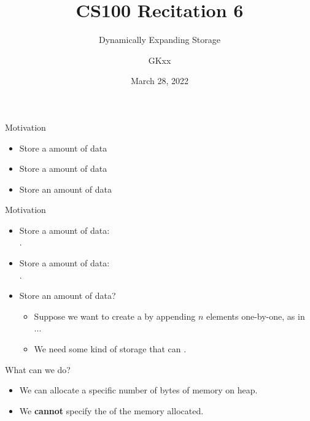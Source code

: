 \documentclass{beamer}
\title{CS100 Recitation 6}
\subtitle{Dynamically Expanding Storage}
\author{GKxx}
\date{March 28, 2022}
\begin{document}
\begin{frame}
    \maketitle
\end{frame}

\begin{frame}{Motivation}
    \begin{itemize}
        \item Store a  amount of data
        \item Store a  amount of data
        \item Store an  amount of data
    \end{itemize}
\end{frame}

\begin{frame}{Motivation}
    \begin{itemize}
        \item Store a  amount of data:\\
        .
        \item Store a  amount of data:\\
        .
        \item Store an  amount of data?
        \pause
        \begin{itemize}
            \item Suppose we want to create a  by appending \(n\) elements one-by-one, as in ...
            \pause
            \item We need some kind of storage that can .
        \end{itemize}
    \end{itemize}
\end{frame}

\begin{frame}{What can we do?}
    \begin{itemize}
        \item We can allocate a specific number of bytes of memory on heap.
        \item We \textbf{cannot} specify the  of the memory allocated. 
    \end{itemize}
\end{frame}
\end{document}
